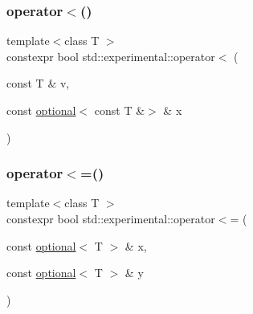 \mbox{\label{namespacestd_1_1experimental_a3905d16fb3b1c1627ff2082e6159d4fb}} 
\subsubsection{\texorpdfstring{operator$<$()}{operator<()}\hspace{0.1cm}{\footnotesize\ttfamily [9/9]}}
{\footnotesize\ttfamily template$<$class T $>$ \\
constexpr bool std\+::experimental\+::operator$<$ (\begin{DoxyParamCaption}\item[{const T \&}]{v,  }\item[{const \mbox{\hyperlink{classstd_1_1experimental_1_1optional}{optional}}$<$ const T \&$>$ \&}]{x }\end{DoxyParamCaption})}

\mbox{\label{namespacestd_1_1experimental_afd5e1ebb8edd29dc3916bf546c9ffca3}} 
\subsubsection{\texorpdfstring{operator$<$=()}{operator<=()}\hspace{0.1cm}{\footnotesize\ttfamily [1/9]}}
{\footnotesize\ttfamily template$<$class T $>$ \\
constexpr bool std\+::experimental\+::operator$<$= (\begin{DoxyParamCaption}\item[{const \mbox{\hyperlink{classstd_1_1experimental_1_1optional}{optional}}$<$ T $>$ \&}]{x,  }\item[{const \mbox{\hyperlink{classstd_1_1experimental_1_1optional}{optional}}$<$ T $>$ \&}]{y }\end{DoxyParamCaption})}

\mbox{\label{namespacestd_1_1experimental_a2130b2ce528946a4ef4e56f80d823267}} 
